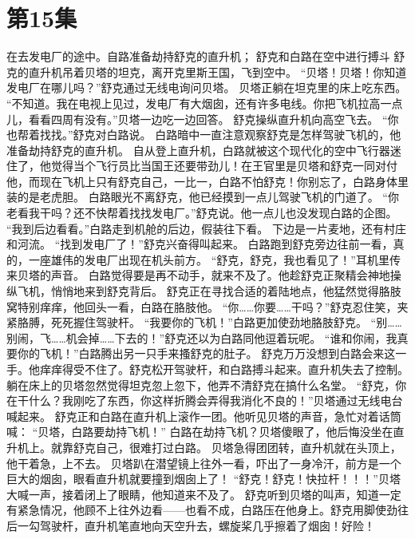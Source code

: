 \documentclass[a4paper,12pt,UTF8,twoside]{ctexbook}
\begin{document}
\chapter{第15集}   
        在去发电厂的途中。自路准备劫持舒克的直升机； 
        舒克和白路在空中进行搏斗   
        舒克的直升机吊着贝塔的坦克，离开克里斯王国，飞到空中。 
        “贝塔！贝塔！你知道发电厂在哪儿吗？”舒克通过无线电询问贝塔。 
        贝塔正躺在坦克里的床上吃东西。 
        “不知道。我在电视上见过，发电厂有大烟囱，还有许多电线。你把飞机拉高一点儿，看看四周有没有。”贝塔一边吃一边回答。 
        舒克操纵直升机向高空飞去。 
        “你也帮着找找。”舒克对白路说。 
        白路暗中一直注意观察舒克是怎样驾驶飞机的，他准备劫持舒克的直升机。 
        自从登上直升机，白路就被这个现代化的空中飞行器迷住了，他觉得当个飞行员比当国王还要带劲儿！在王官里是贝塔和舒克一同对付他，而现在飞机上只有舒克自己，一比一，白路不怕舒克！你别忘了，白路身体里装的是老虎胆。 
        白路眼光不离舒克，他已经摸到一点儿驾驶飞机的门道了。 
        “你老看我干吗？还不快帮着找找发电厂。”舒克说。他一点儿也没发现白路的企图。 
        “我到后边看看。”白路走到机舱的后边，假装往下看。 
        下边是一片麦地，还有村庄和河流。 
        “找到发电厂了！”舒克兴奋得叫起来。 
        白路跑到舒克旁边往前一看，真的，一座雄伟的发电厂出现在机头前方。 
        “舒克，舒克，我也看见了！”耳机里传来贝塔的声音。 
        白路觉得要是再不动手，就来不及了。他趁舒克正聚精会神地操纵飞机，悄悄地来到舒克背后。 
        舒克正在寻找合适的着陆地点，他猛然觉得胳肢窝特别痒痒，他回头一看，白路在胳肢他。 
        “你……你要……干吗？”舒克忍住笑，夹紧胳膊，死死握住驾驶杆。 
        “我要你的飞机！”白路更加使劲地胳肢舒克。 
        “别……别闹，飞……机会掉……下去的！”舒克还以为白路同他逗着玩呢。 
        “谁和你闹，我真要你的飞机！”白路腾出另一只手来搔舒克的肚子。 
        舒克万万没想到白路会来这一手。他痒痒得受不住了。舒克松开驾驶杆，和白路搏斗起来。直升机失去了控制。 
        躺在床上的贝塔忽然觉得坦克忽上忽下，他弄不清舒克在搞什么名堂。 
        “舒克，你在干什么？我刚吃了东西，你这样折腾会弄得我消化不良的！”贝塔通过无线电台喊起来。 
        舒克正和白路在直升机上滚作一团。他听见贝塔的声音，急忙对着话筒喊： 
        “贝塔，白路要劫持飞机！” 
        白路在劫持飞机？贝塔傻眼了，他后悔没坐在直升机上。就靠舒克自己，很难打过白路。 
        贝塔急得团团转，直升机就在头顶上，他干着急，上不去。 
        贝塔趴在潜望镜上往外一看，吓出了一身冷汗，前方是一个巨大的烟囱，眼看直升机就要撞到烟囱上了！ 
        “舒克！舒克！快拉杆！！！”贝塔大喊一声，接着闭上了眼睛，他知道来不及了。 
        舒克听到贝塔的叫声，知道一定有紧急情况，他顾不上往外边看——也看不成，白路压在他身上。舒克用脚使劲往后一勾驾驶杆，直升机笔直地向天空升去，螺旋桨几乎擦着了烟囱！好险！ 
\end{document}
